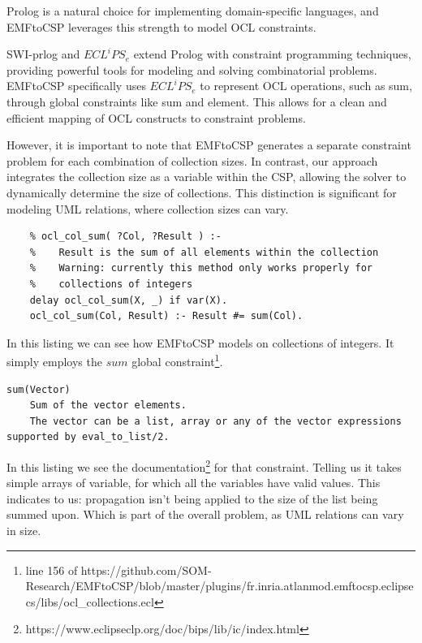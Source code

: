 Prolog is a natural choice for implementing domain-specific languages, and EMFtoCSP leverages this strength to model OCL constraints.

SWI-prlog and $ECL^iPS_e$ extend Prolog with constraint programming techniques, providing powerful tools for modeling and solving combinatorial problems.
EMFtoCSP specifically uses $ECL^iPS_e$ to represent OCL operations, such as sum, through global constraints like sum and element. This allows for a clean and efficient mapping of OCL constructs to constraint problems.



However, it is important to note that EMFtoCSP generates a separate constraint problem for each combination of collection sizes.
In contrast, our approach integrates the collection size as a variable within the CSP, allowing the solver to dynamically determine the size of collections. This distinction is significant for modeling UML relations, where collection sizes can vary.

\begin{lstlisting}
    % ocl_col_sum( ?Col, ?Result ) :-
    %    Result is the sum of all elements within the collection
    %    Warning: currently this method only works properly for
    %    collections of integers
    delay ocl_col_sum(X, _) if var(X).
    ocl_col_sum(Col, Result) :- Result #= sum(Col).
\end{lstlisting}
In this listing we can see how EMFtoCSP models  on collections of integers.
It simply employs the $sum$ global constraint\footnote{line 156 of https://github.com/SOM-Research/EMFtoCSP/blob/master/plugins/fr.inria.atlanmod.emftocsp.eclipsecs/libs/ocl_collections.ecl}.
\begin{lstlisting}
sum(Vector)
    Sum of the vector elements. 
    The vector can be a list, array or any of the vector expressions supported by eval_to_list/2.
\end{lstlisting}
In this listing we see the documentation\footnote{https://www.eclipseclp.org/doc/bips/lib/ic/index.html} for that constraint.
Telling us it takes simple arrays of variable, for which all the variables have valid values.
This indicates to us: propagation isn't being applied to the size of the list being summed upon.
Which is part of the overall problem, as UML relations can vary in size.
